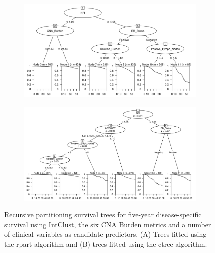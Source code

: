 \begin{figure}[!h]
\centering

\vspace{1cm}

\begin{subfigure}{\textwidth}
\subcaption{}
\includegraphics[width=1\textwidth]{../figures/Chapter_3/Clin_PartyKit_Survival_Burden_FiveYearDSS_INTCLUST.png}
\end{subfigure}

\vspace{3cm}

\begin{subfigure}{\textwidth}
\subcaption{}
\includegraphics[width=1\textwidth]{../figures/Chapter_3/Clin_Ctree_Survival_Burden_FiveYearDSS_INTCLUST.png}
\end{subfigure}

\vspace{1cm}

\caption[Recursive partitioning survival trees for five-year disease-specific survival using IntClust, the six CNA Burden metrics and a number of clinical variables as candidate predictors.]{Recursive partitioning survival trees for five-year disease-specific survival using IntClust, the six CNA Burden metrics and a number of clinical variables as candidate predictors. (A) Trees fitted using the rpart algorithm and (B) trees fitted using the ctree algorithm.}
\label{fig:INTCLUST_CNA_Burden_FiveYearDSS_Clin}
\end{figure}

